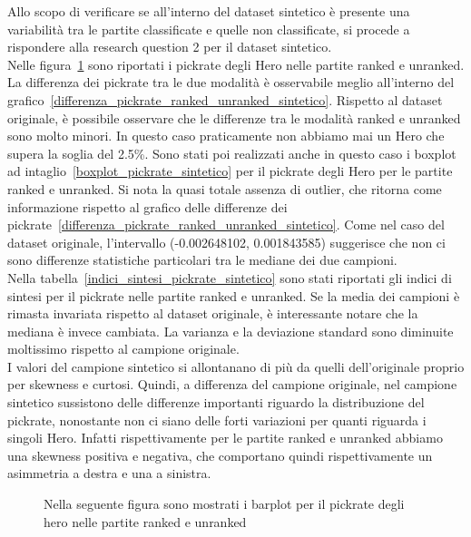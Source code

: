 Allo scopo di verificare se all'interno del dataset sintetico è presente una variabilità tra le partite classificate e quelle non classificate, si procede a rispondere alla research question 2 per il dataset sintetico. \\
Nelle figura~\ref{frequenze_pickrate_ranked_unranked_sintetico} sono riportati i pickrate degli Hero nelle partite ranked e unranked. La differenza dei pickrate tra le due modalità è osservabile meglio all'interno del grafico~\ref{differenza_pickrate_ranked_unranked_sintetico}. Rispetto al dataset originale, è possibile osservare che le differenze tra le modalità ranked e unranked sono molto minori. In questo caso praticamente non abbiamo mai un Hero che supera la soglia del 2.5\%.
Sono stati poi realizzati anche in questo caso i boxplot ad intaglio~\ref{boxplot_pickrate_sintetico} per il pickrate degli Hero per le partite ranked e unranked. Si nota la quasi totale assenza di outlier, che ritorna come informazione rispetto al grafico delle differenze dei pickrate~\ref{differenza_pickrate_ranked_unranked_sintetico}. Come nel caso del dataset originale, l'intervallo (-0.002648102, 0.001843585) suggerisce che non ci sono differenze statistiche particolari tra le mediane dei due campioni. \\
Nella tabella~\ref{indici_sintesi_pickrate_sintetico} sono stati riportati gli indici di sintesi per il pickrate nelle partite ranked e unranked. Se la media dei campioni è rimasta invariata rispetto al dataset originale, è interessante notare che la mediana è invece cambiata. La varianza e la deviazione standard sono diminuite moltissimo rispetto al campione originale. \\
I valori del campione sintetico si allontanano di più da quelli dell'originale proprio per skewness e curtosi. Quindi, a differenza del campione originale, nel campione sintetico sussistono delle differenze importanti riguardo la distribuzione del pickrate, nonostante non ci siano delle forti variazioni per quanti riguarda i singoli Hero. Infatti rispettivamente per le partite ranked e unranked abbiamo una skewness positiva e negativa, che comportano quindi rispettivamente un asimmetria a destra e una a sinistra. 
\begin{figure}[htbp]
\begin{center}
\hspace*{-0.15\linewidth}

\caption{Nella seguente figura sono mostrati i barplot per il pickrate degli hero nelle partite ranked e unranked}
\label{frequenze_pickrate_ranked_unranked_sintetico}
\end{center}
\end{figure}
